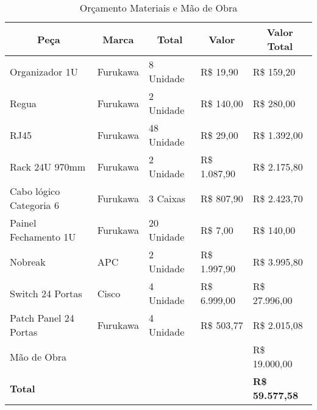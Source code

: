 \begin{table}[h!]
\centering
\caption{Orçamento Materiais e Mão de Obra}
\label{orc}
\begin{tabular}{|l|l|l|l|l|}
\hline
\multicolumn{1}{|c|}{\textbf{Peça}} & \multicolumn{1}{c|}{\textbf{Marca}} & \multicolumn{1}{c|}{\textbf{Total}} & \multicolumn{1}{c|}{\textbf{Valor}} & \multicolumn{1}{c|}{\textbf{Valor Total}} \\ \hline
Organizador 1U                      & Furukawa                            & 8 Unidade                           & R\$      19,90                      & R\$     159,20                            \\ \hline
Regua                               & Furukawa                            & 2 Unidade                           & R\$    140,00                       & R\$     280,00                            \\ \hline
RJ45                                & Furukawa                            & 48 Unidade                          & R\$      29,00                      & R\$  1.392,00                             \\ \hline
Rack 24U 970mm                      & Furukawa                            & 2 Unidade                           & R\$ 1.087,90                        & R\$  2.175,80                             \\ \hline
Cabo lógico Categoria 6             & Furukawa                            & 3 Caixas                            & R\$    807,90                       & R\$  2.423,70                             \\ \hline
Painel Fechamento 1U                & Furukawa                            & 20 Unidade                          & R\$        7,00                     & R\$     140,00                            \\ \hline
Nobreak                             & APC                                 & 2 Unidade                           & R\$ 1.997,90                        & R\$   3.995,80                            \\ \hline
Switch 24 Portas                    & Cisco                               & 4 Unidade                           & R\$ 6.999,00                        & R\$ 27.996,00                             \\ \hline
Patch Panel 24 Portas               & Furukawa                            & 4 Unidade                           & R\$    503,77                       & R\$ 2.015,08                              \\ \hline
Mão de Obra                         &                                     &                                     &                                     & R\$ 19.000,00                             \\ \hline
\textbf{Total}                      &                                     &                                     &                                     & \textbf{R\$ 59.577,58}                    \\ \hline
\end{tabular}
\end{table}